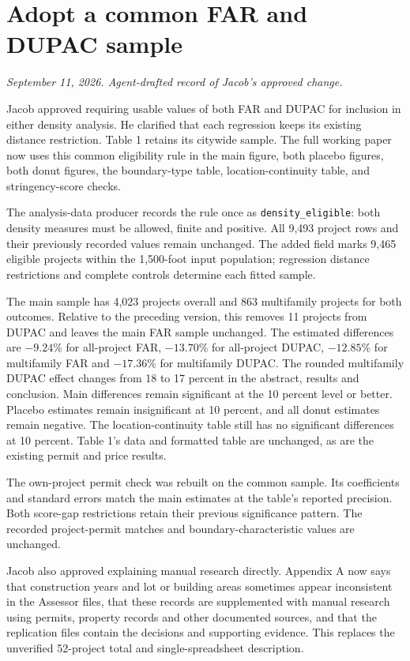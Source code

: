 \section*{Adopt a common FAR and DUPAC sample}
\textit{September 11, 2026. Agent-drafted record of Jacob's approved change.}

Jacob approved requiring usable values of both FAR and DUPAC for inclusion in
either density analysis. He clarified that each regression keeps its existing
distance restriction. Table 1 retains its citywide sample. The full working
paper now uses this common eligibility rule in the main figure, both placebo
figures, both donut figures, the boundary-type table, location-continuity table,
and stringency-score checks.

The analysis-data producer records the rule once as \texttt{density\_eligible}:
both density measures must be allowed, finite and positive. All 9,493 project
rows and their previously recorded values remain unchanged. The added field
marks 9,465 eligible projects within the 1,500-foot input population; regression
distance restrictions and complete controls determine each fitted sample.

The main sample has 4,023 projects overall and 863 multifamily projects for both
outcomes. Relative to the preceding version, this removes 11 projects from
DUPAC and leaves the main FAR sample unchanged. The estimated differences are
$-9.24\%$ for all-project FAR, $-13.70\%$ for all-project DUPAC, $-12.85\%$ for
multifamily FAR and $-17.36\%$ for multifamily DUPAC. The rounded multifamily
DUPAC effect changes from 18 to 17 percent in the abstract, results and
conclusion. Main differences remain significant at the 10 percent level or
better. Placebo estimates remain insignificant at 10 percent, and all donut
estimates remain negative. The location-continuity table still has no
significant differences at 10 percent. Table 1's data and formatted table are
unchanged, as are the existing permit and price results.

The own-project permit check was rebuilt on the common sample. Its coefficients
and standard errors match the main estimates at the table's reported precision.
Both score-gap restrictions retain their previous significance pattern. The
recorded project-permit matches and boundary-characteristic values are unchanged.

Jacob also approved explaining manual research directly. Appendix A now says
that construction years and lot or building areas sometimes appear inconsistent
in the Assessor files, that these records are supplemented with manual research
using permits, property records and other documented sources, and that the
replication files contain the decisions and supporting evidence. This replaces
the unverified 52-project total and single-spreadsheet description.


